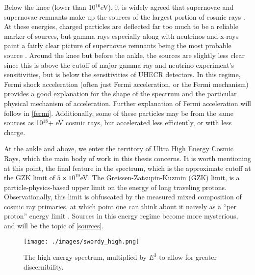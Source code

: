 Below the knee (lower than 10$^{16}$eV), it is widely agreed that supernovae and supernovae remnants make up the sources of the largest portion of cosmic rays \cite{stanev, crapp}. At these energies, charged particles are deflected far too much to be a reliable marker of sources, but gamma rays especially along with neutrinos and x-rays paint a fairly clear picture of supernovae remnants being the most probable source \cite{stanev, sean, foteini}. Around the knee but before the ankle, the sources are slightly less clear since this is above the cutoff of major gamma ray and neutrino experiment's sensitivities, but is below the sensitivities of UHECR detectors. In this regime, Fermi shock acceleration (often just Fermi acceleration, or the Fermi mechanism) provides a good explanation for the shape of the spectrum and the particular physical mechanism of acceleration. Further explanation of Fermi acceleration will follow in \autoref{fermi}. Additionally, some of these particles may be from the same sources as 10$^{18}$+ eV cosmic rays, but accelerated less efficiently, or with less charge. 

At the ankle and above, we enter the territory of Ultra High Energy Cosmic Rays, which the main body of work in this thesis 
concerns. It is worth mentioning at this point, the final feature in the spectrum, which is the approximate cutoff at the GZK limit of $5\times10^{19}$eV. The Greissen-Zatsupin-Kuzmin (GZK) limit, is a particle-physics-based upper limit on the energy of long traveling protons. Observationally, this limit is obfuscated by the measured mixed composition of cosmic ray primaries, at which point one can think about it naively as a ``per proton'' energy limit \cite{futuregzk}. Sources in this energy regime become more mysterious, and will be the topic of \autoref{sources}. 
\begin{figure}[h!]
\begin{center}
\texttt{[image: ./images/swordy\_high.png]}
\begin{singlespace}
\caption[High Energy All Particle Spectrum]{The high energy spectrum, multiplied by $E^3$ to allow for greater discernibility.}
\end{singlespace}
\label{swordyhigh}
\end{center}
\end{figure}
